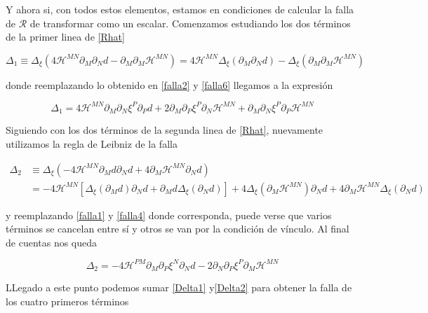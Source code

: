 \documentclass{article}
\numberwithin{equation}{section}
\begin{document}
Y ahora si, con todos estos elementos, estamos en condiciones de calcular la falla de $ \mathcal{R} $ de transformar como un escalar. Comenzamos estudiando los dos términos de la primer linea de \ref{Rhat}

\begin{equation}\label{key}
\Delta_1 \equiv \Delta_{\xi} \left(4\mathcal{H}^{MN}\partial_M\partial_N d - \partial_M\partial_M\mathcal{H}^{MN}\right) = 4\mathcal{H}^{MN} \Delta_{\xi}\left( \partial_M\partial_N d\right) -\Delta_{\xi}\left(\partial_M\partial_M\mathcal{H}^{MN}\right)
\end{equation}

donde reemplazando lo obtenido en \ref{falla2} y \ref{falla6} llegamos a la expresión

\begin{equation}\label{Delta1}
\Delta_1 = 4\mathcal{H}^{MN}\partial_M\partial_N\xi^P\partial_P d + 2\partial_M \partial_P\xi^P \partial_N \mathcal{H}^{MN} + \partial_M \partial_N\xi^P \partial_P \mathcal{H}^{MN}
\end{equation}

Siguiendo con los dos términos de la segunda linea de \ref{Rhat}, nuevamente utilizamos la regla de Leibniz de la falla

\begin{equation}\label{key}
\begin{aligned}
\Delta_2 &\equiv \Delta_{\xi} \left(- 4\mathcal{H}^{MN}\partial_M d\partial_N d + 4\partial_M\mathcal{H}^{MN}\partial_N d\right) \\
&= - 4\mathcal{H}^{MN} \left[ \Delta_{\xi}\left(\partial_M d\right)\partial_N d + \partial_M d\Delta_{\xi}\left(\partial_N d\right) \right] + 4\Delta_{\xi}\left(\partial_M\mathcal{H}^{MN}\right)\partial_N d +4\partial_M\mathcal{H}^{MN}\Delta_{\xi}\left(\partial_N d\right)
\end{aligned}
\end{equation}

y reemplazando \ref{falla1} y \ref{falla4} donde corresponda, puede verse que varios términos se cancelan entre sí y otros se van por la condición de vínculo. Al final de cuentas nos queda

\begin{equation}\label{Delta2}
\Delta_2=-4\mathcal{H}^{PM}\partial_M\partial_P\xi^N\partial_N d -2\partial_N\partial_P\xi^P\partial_M\mathcal{H}^{MN}
\end{equation}

LLegado a este punto podemos sumar \ref{Delta1} y\ref{Delta2} para obtener la falla de los cuatro primeros términos
\end{document}
